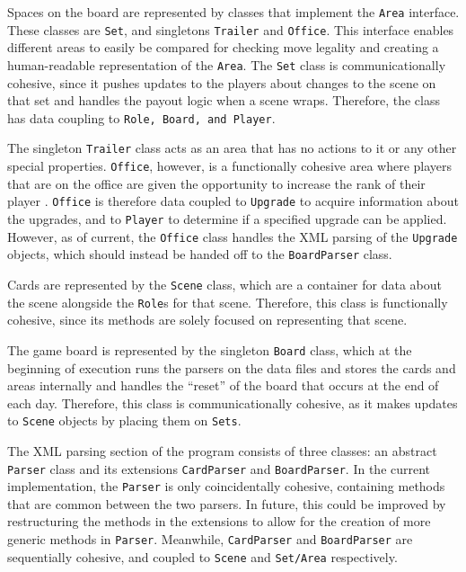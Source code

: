 \documentclass[letterpaper, twoside]{report}
\begin{document}
Spaces on the board are represented by classes that implement the \texttt{Area} interface. These classes are \texttt{Set}, and singletons \texttt{Trailer} and \texttt{Office}. This interface enables different areas to easily be compared for checking move legality and creating a human-readable representation of the \texttt{Area}.  The \texttt{Set} class is communicationally cohesive, since it pushes updates to the players about changes to the scene on that set and handles the payout logic when a scene wraps. Therefore, the class has data coupling to \texttt{Role, Board, and Player}.


The singleton \texttt{Trailer} class acts as an area that has no actions to it or any other special properties. \texttt{Office}, however, is a functionally cohesive area where players that are on the office are given the opportunity to increase the rank of their player . \texttt{Office} is therefore data coupled to \texttt{Upgrade} to acquire information about the upgrades, and to \texttt{Player} to determine if a specified upgrade can be applied. However, as of current, the \texttt{Office} class handles the XML parsing of the \texttt{Upgrade} objects, which should instead be handed off to the \texttt{BoardParser} class.


Cards are represented by the \texttt{Scene} class, which are a container for data about the scene alongside the \texttt{Role}s for that scene. Therefore, this class is functionally cohesive, since its methods are solely focused on representing that scene.


The game board is represented by the singleton \texttt{Board} class, which at the beginning of execution runs the parsers on the data files and stores the cards and areas internally and handles the “reset” of the board that occurs at the end of each day. Therefore, this class is communicationally cohesive, as it makes updates to \texttt{Scene} objects by placing them on \texttt{Sets}.


The XML parsing section of the program consists of three classes: an abstract \texttt{Parser} class and its extensions \texttt{CardParser} and \texttt{BoardParser}. In the current implementation, the \texttt{Parser} is only coincidentally cohesive, containing methods that are common between the two parsers. In future, this could be improved by restructuring the methods in the extensions to allow for the creation of more generic methods in \texttt{Parser}. Meanwhile, \texttt{CardParser} and \texttt{BoardParser} are sequentially cohesive, and coupled to \texttt{Scene} and \texttt{Set/Area} respectively.
\end{document}
